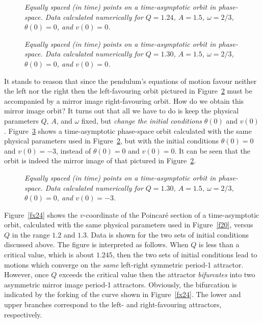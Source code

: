 \begin{figure}
\epsfysize=2.5in
\centerline{}
\caption{\em Equally spaced (in time) points on a time-asymptotic orbit in phase-space.
Data calculated numerically for $Q=1.24$, $A=1.5$, $\omega=2/3$, $\theta(0)=0$, and
$v(0)=0$. }\label{f21}
\end{figure}

\begin{figure}
\epsfysize=2.5in
\centerline{}
\caption{\em Equally spaced (in time) points on a time-asymptotic orbit in phase-space.
Data calculated  
numerically  for $Q=1.30$, $A=1.5$, $\omega=2/3$, $\theta(0)=0$, and
$v(0)=0$. }\label{f22}
\end{figure}

It stands to reason that since the pendulum's equations of motion favour neither the
left nor the right then the left-favouring orbit pictured in Figure~\ref{f22} must be accompanied
by a mirror image right-favouring orbit. How do we obtain this mirror image orbit?
It turns out that all we have to do is keep the physical  parameters $Q$, $A$, and $\omega$
fixed, but {\em change the initial conditions} $\theta(0)$ and $v(0)$. Figure~\ref{f23} shows
a time-asymptotic phase-space orbit calculated with the same physical parameters  used in Figure~\ref{f22}, but
with the initial conditions $\theta(0)=0$ and $v(0)=-3$, instead of $\theta(0)=0$ and
$v(0)=0$. It can be seen that the orbit is indeed the mirror image of that pictured in Figure~\ref{f22}.

\begin{figure}
\epsfysize=2.5in
\centerline{}
\caption{\em Equally spaced (in time) points on a time-asymptotic orbit in phase-space. Data
 calculated numerically for $Q=1.30$, $A=1.5$, $\omega=2/3$, $\theta(0)=0$, and
$v(0)=-3$. }\label{f23}
\end{figure}

Figure~\ref{fx24} shows the $v$-coordinate of the Poincar\'{e} section of a time-asymptotic orbit,
calculated with the same physical parameters used in Figure~\ref{f20}, versus
  $Q$ in the range $1.2$ and $1.3$. Data is shown for the two sets of
initial conditions discussed above. The figure is interpreted as
follows. When $Q$ is less than a critical value,
which is about $1.245$, then the two sets of initial conditions lead to motions
which converge on the {\em same}\/ left-right symmetric 
period-1 attractor. However, once
$Q$ exceeds the critical value then the attractor {\em bifurcates}\/ into two 
asymmetric mirror image  period-1
attractors.  Obviously, the bifurcation is indicated by the forking of the
curve shown in Figure~\ref{fx24}. The lower and upper branches correspond to the left- and right-favouring
 attractors, respectively.

